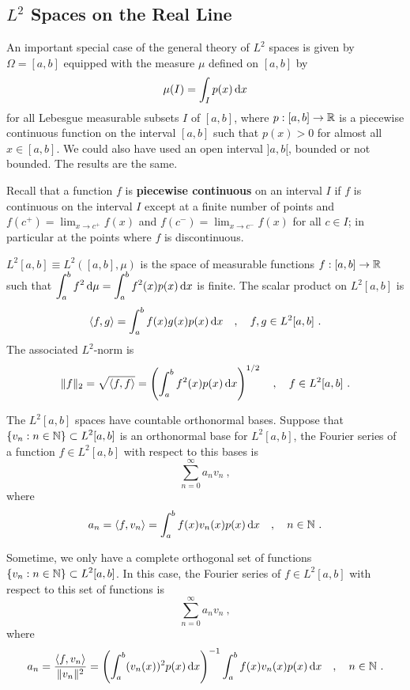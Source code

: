 \subsection{$\displaystyle L^2$ Spaces on the Real Line}

An important special case of the general theory of $\displaystyle L^2$ spaces is
given by $\Omega=[a,b]$ equipped with the measure $\mu$ defined on
$[a,b]$ by
\[
  \mu(I) = \int_I p(x) \,\mathrm{d}{x}
\]
for all Lebesgue measurable subsets $I$ of $[a,b]$, where
$p:[a,b]\rightarrow \mathbb{R}$ is a piecewise continuous function on the
interval $[a,b]$ such that $p(x) > 0$ for almost all $x \in [a,b]$.
We could also have used an open interval $]a,b[$, bounded or not
bounded.  The results are the same.

Recall that a function $f$ is
{\bfseries piecewise continuous} on an
interval $I$ if $f$ is continuous on the interval $I$ except at a
finite number of points and
$\displaystyle f(c^+) = \lim_{x\to c^+} f(x)$ and
$\displaystyle f(c^-) = \lim_{x\to c^-} f(x)$ for all $c \in I$; in
particular at the points where $f$ is discontinuous.

$\displaystyle L^2[a,b] \equiv L^2([a,b],\mu)$ is the space of
measurable functions $f:[a,b]\rightarrow \mathbb{R}$ such that
$\displaystyle \int_a^b f^2 \,\mathrm{d}{\mu} = \int_a^b f^2(x) p(x) \,\mathrm{d}{x}$
is finite.  The scalar product on $\displaystyle L^2[a,b]$ is 
\begin{equation} \label{fu_an_r_scp}
\left\langle{f} , {g}\right\rangle = \int_a^b f(x) g(x) p(x) \,\mathrm{d}{x} \quad , \quad f, g \in L^2[a,b] \ .
\end{equation}
The associated $\displaystyle L^2$-norm is
\begin{equation} \label{fu_an_r_2norm}
\| f \|_2 = \sqrt{\left\langle{f} , {f}\right\rangle} = \left(\int_a^b f^2(x) p(x) \,\mathrm{d}{x}\right)^{1/2}
\quad , \quad f \in L^2[a,b] \ .
\end{equation}

The $\displaystyle L^2[a,b]$ spaces have countable orthonormal bases.
Suppose that $\displaystyle \{v_n : n \in \mathbb{N} \} \subset L^2[a,b]$
is an orthonormal base for $\displaystyle L^2[a,b]$, the Fourier
series of a function $\displaystyle f \in L^2[a,b]$ with respect to
this bases is
\begin{equation} \label{fsOne}
\sum_{n=0}^{\infty} a_{n} v_n \ ,
\end{equation}
where
\[
a_n = \left\langle{f} , {v_n}\right\rangle = \int_a^b f(x) v_n(x) p(x) \,\mathrm{d}{x}
\quad, \quad n \in \mathbb{N} \ .
\]

Sometime, we only have a complete orthogonal set of
functions $\displaystyle \{v_n : n \in \mathbb{N} \} \subset L^2[a,b]$.
In this case, the Fourier series of $\displaystyle f \in L^2[a,b]$
with respect to this set of functions is
\begin{equation} \label{fsTwo}
\sum_{n=0}^{\infty} a_{n} v_n \ ,
\end{equation}
where
\[
a_n = \frac{\left\langle{f} , {v_n}\right\rangle}{\| v_n \|^2} 
= \left( \int_a^b (v_n(x))^2 p(x) \,\mathrm{d}{x} \right)^{-1}
\int_a^b f(x) v_n(x) p(x) \,\mathrm{d}{x}
\quad, \quad n \in \mathbb{N} \ .
\]

